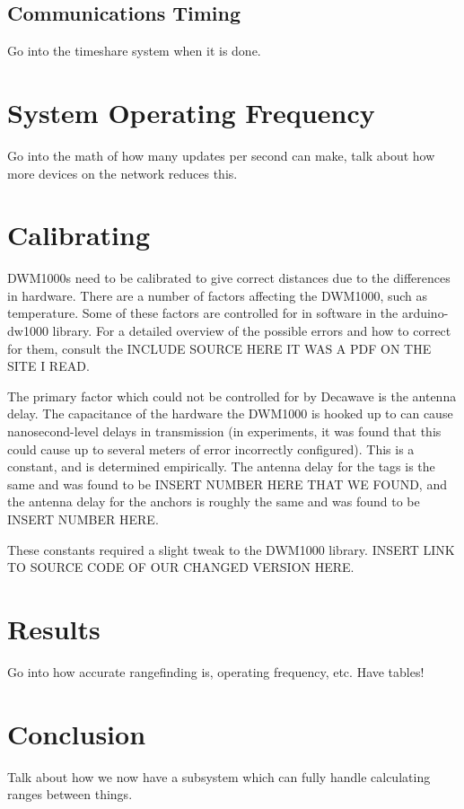 \subsection{Communications Timing}
Go into the timeshare system when it is done. 

\section{System Operating Frequency}
Go into the math of how many updates per second can make, talk about how more devices on the network reduces this.

\section{Calibrating}
DWM1000s need to be calibrated to give correct distances due to the differences in hardware. There are a number of factors affecting the DWM1000, such as temperature. Some of these factors are controlled for in software in the arduino-dw1000 library. For a detailed overview of the possible errors and how to correct for them, consult the INCLUDE SOURCE HERE IT WAS A PDF ON THE SITE I READ.

The primary factor which could not be controlled for by Decawave is the antenna delay. The capacitance of the hardware the DWM1000 is hooked up to can cause nanosecond-level delays in transmission (in experiments, it was found that this could cause up to several meters of error incorrectly configured). This is a constant, and is determined empirically. The antenna delay for the tags is the same and was found to be INSERT NUMBER HERE THAT WE FOUND, and the antenna delay for the anchors is roughly the same and was found to be INSERT NUMBER HERE.

These constants required a slight tweak to the DWM1000 library. INSERT LINK TO SOURCE CODE OF OUR CHANGED VERSION HERE.

\section{Results}
Go into how accurate rangefinding is, operating frequency, etc. Have tables!

\section{Conclusion}
Talk about how we now have a subsystem which can fully handle calculating ranges between things.
